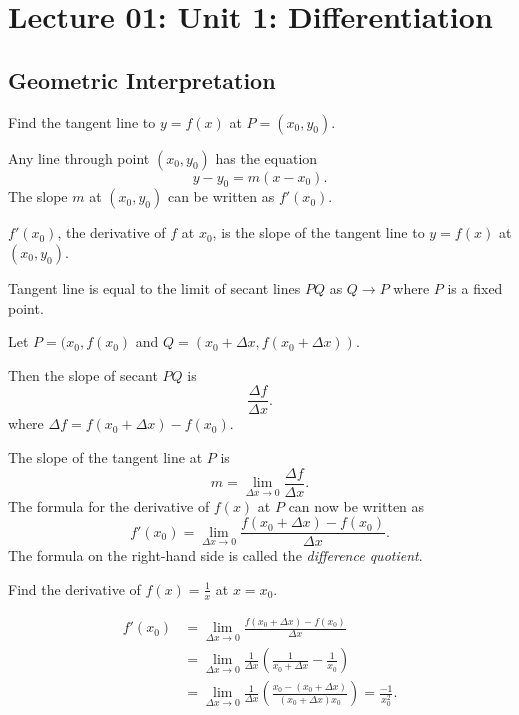 \section{Lecture 01: Unit 1: Differentiation}

\subsection{Geometric Interpretation}

Find the tangent line to \( y = f(x) \) at \( P = (x_0, y_0) \).

Any line through point \( (x_0, y_0) \) has the equation
\[
    y - y_0 = m(x - x_0).
\]
The slope \( m \) at \( (x_0, y_0) \) can be written as \( f'(x_0) \).

\begin{definition}
\( f'(x_0) \), the derivative of \( f \) at \( x_0 \), is the slope of
the tangent line to \( y = f(x) \) at \( (x_0, y_0) \).
\end{definition}

\begin{definition}
Tangent line is equal to the limit of secant lines \( PQ \) as \( Q \to
P \) where \( P \) is a fixed point.
\end{definition}

Let \( P = (x_0, f(x_0) \) and \( Q = (x_0 + \Delta x, f(x_0 + \Delta
x)) \).

Then the slope of secant \( PQ \) is
\[
    \frac{\Delta f}{\Delta x}.
\]
where \( \Delta f = f(x_0 + \Delta x) - f(x_0) \).

The slope of the tangent line at \( P \) is
\[
    m = \lim_{\Delta x \to 0} \frac{\Delta f}{\Delta x}.
\]
The formula for the derivative of \( f(x) \) at \( P \) can now be
written as
\[
    f'(x_0) = \lim_{\Delta x \to 0}
              \frac{f(x_0 + \Delta x) - f(x_0)}{\Delta x}.
\]
The formula on the right-hand side is called the \emph{difference
quotient}.

\begin{example}
Find the derivative of \( f(x) = \frac{1}{x} \) at \( x = x_0 \).
\end{example}
\begin{solution}
\begin{align*}
    f'(x_0)
        & = \lim_{\Delta x \to 0}
            \frac{f(x_0 + \Delta x) - f(x_0)}{\Delta x} \\
        & = \lim_{\Delta x \to 0}
            \frac{1}{\Delta x}
            \left( \frac{1}{x_0 + \Delta x} - \frac{1}{x_0} \right) \\
        & = \lim_{\Delta x \to 0}
            \frac{1}{\Delta x}
            \left( \frac{x_0 - (x_0 + \Delta x)}
                        {(x_0 + \Delta x)x_0} \right)
          = \frac{-1}{x_0^2}.
\end{align*}
\end{solution}

